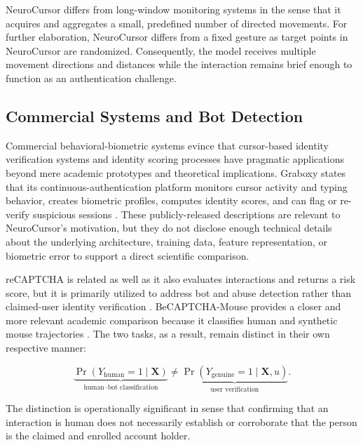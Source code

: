 \documentclass[conference]{IEEEtran}
\begin{document}
NeuroCursor differs from long-window monitoring systems in the sense that it acquires and aggregates a small, predefined number of directed movements. For further elaboration, NeuroCursor differs from a fixed gesture as target points in NeuroCursor are randomized. Consequently, the model receives multiple movement directions and distances while the interaction remains brief enough to function as an authentication challenge. 

\subsection{Commercial Systems and Bot Detection}

Commercial behavioral-biometric systems evince that cursor-based identity verification systems and identity scoring processes have pragmatic applications beyond mere academic prototypes and theoretical implications. Graboxy states that its continuous-authentication platform monitors cursor activity and typing behavior, creates biometric profiles, computes identity scores, and can flag or re-verify suspicious sessions \cite{graboxyContinuous, graboxyMFA}. These publicly-released descriptions are relevant to NeuroCursor's motivation, but they do not disclose enough technical details about the underlying architecture, training data, feature representation, or biometric error to support a direct scientific comparison. 

reCAPTCHA is related as well as it also evaluates interactions and returns a risk score, but it is primarily utilized to address bot and abuse detection rather than claimed-user identity verification \cite{googleRecaptchaV3}. BeCAPTCHA-Mouse provides a closer and more relevant academic comparison because it classifies human and synthetic mouse trajectories \cite{acien2020BeCAPTCHA}. The two tasks, as a result, remain distinct in their own respective manner:

\begin{equation}
\underbrace{
\Pr(Y_{\mathrm{human}}=1 \mid \mathbf{X})
}_{\text{human--bot classification}}
\neq
\underbrace{
\Pr(Y_{\mathrm{genuine}}=1 \mid \mathbf{X},u)
}_{\text{user verification}}.
\label{eq:captcha_verification_distinction}
\end{equation}

The distinction is operationally significant in sense that confirming that an interaction is human does not necessarily establish or corroborate that the person is the claimed and enrolled account holder. 
\end{document}
